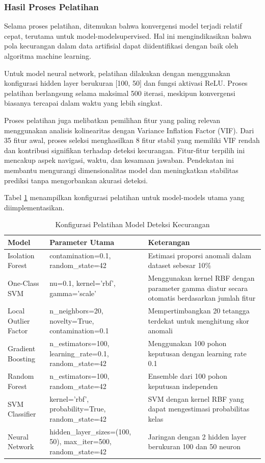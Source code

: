 \subsubsection{Hasil Proses Pelatihan}

Selama proses pelatihan, ditemukan bahwa konvergensi model terjadi relatif cepat, terutama untuk model-modelsupervised. Hal ini mengindikasikan bahwa pola kecurangan dalam data artifisial dapat diidentifikasi dengan baik oleh algoritma machine learning.

Untuk model neural network, pelatihan dilakukan dengan menggunakan konfigurasi hidden layer berukuran [100, 50] dan fungsi aktivasi ReLU. Proses pelatihan berlangsung selama maksimal 500 iterasi, meskipun konvergensi biasanya tercapai dalam waktu yang lebih singkat. 

Proses pelatihan juga melibatkan pemilihan fitur yang paling relevan menggunakan analisis kolinearitas dengan Variance Inflation Factor (VIF). Dari 35 fitur awal, proses seleksi menghasilkan 8 fitur stabil yang memiliki VIF rendah dan kontribusi signifikan terhadap deteksi kecurangan. Fitur-fitur terpilih ini mencakup aspek navigasi, waktu, dan kesamaan jawaban. Pendekatan ini membantu mengurangi dimensionalitas model dan meningkatkan stabilitas prediksi tanpa mengorbankan akurasi deteksi.

Tabel \ref{tabel:modelTrainingConfig} menampilkan konfigurasi pelatihan untuk model-models utama yang diimplementasikan.

\begin{table}[htbp]
\centering
\caption{Konfigurasi Pelatihan Model Deteksi Kecurangan}
\label{tabel:modelTrainingConfig}
\begin{tabular}{|l|p{4cm}|p{6cm}|}
\hline
\textbf{Model} & \textbf{Parameter Utama} & \textbf{Keterangan} \\
\hline
Isolation Forest & contamination=0.1, random\_state=42 & Estimasi proporsi anomali dalam dataset sebesar 10\% \\
\hline
One-Class SVM & nu=0.1, kernel='rbf', gamma='scale' & Menggunakan kernel RBF dengan parameter gamma diatur secara otomatis berdasarkan jumlah fitur \\
\hline
Local Outlier Factor & n\_neighbors=20, novelty=True, contamination=0.1 & Mempertimbangkan 20 tetangga terdekat untuk menghitung skor anomali \\
\hline
Gradient Boosting & n\_estimators=100, learning\_rate=0.1, random\_state=42 & Menggunakan 100 pohon keputusan dengan learning rate 0.1 \\
\hline
Random Forest & n\_estimators=100, random\_state=42 & Ensemble dari 100 pohon keputusan independen \\
\hline
SVM Classifier & kernel='rbf', probability=True, random\_state=42 & SVM dengan kernel RBF yang dapat mengestimasi probabilitas kelas \\
\hline
Neural Network & hidden\_layer\_sizes=(100, 50), max\_iter=500, random\_state=42 & Jaringan dengan 2 hidden layer berukuran 100 dan 50 neuron \\
\hline
\end{tabular}
\end{table}

